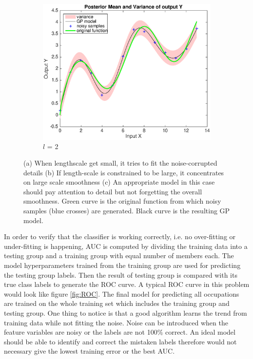 \documentclass[11pt]{report}
\numberwithin{equation}{chapter}
\begin{document}
\begin{spacing}{2}
\begin{figure}[!htb]
\hspace*{0.25\textwidth}
\begin{subfigure}{0.48\textwidth}
\centering
	\includegraphics[scale = 0.4]{fit.eps}
	\caption{$l$ = 2}
\end{subfigure}



\caption{(a) When lengthscale get small, it tries to fit the noise-corrupted details (b) If length-scale is constrained to be large, it concentrates on large scale smoothness (c) An appropriate model in this case should pay attention to detail but not forgetting the overall smoothness. Green curve is the original function from which noisy samples (blue crosses) are generated. Black curve is the resulting GP model.}

\label{fig:overfitting}
\end{figure}

In order to verify that the classifier is working correctly, i.e. no over-fitting or under-fitting is happening, AUC is computed by dividing the training data into a testing group and a training group with equal number of members each. The model hyperparameters trained from the training group are used for predicting the testing group labels. Then the result of testing group is compared with its true class labels to generate the ROC curve. A typical ROC curve in this problem would look like figure \ref{fig:ROC}. The final model for predicting all occupations are trained on the whole training set which includes the training group and testing group. One thing to notice is that a good algorithm learns the trend from training data while not fitting the noise. Noise can be introduced when the feature variables are noisy or the labels are not 100\% correct. An ideal model should be able to identify and correct the mistaken labels therefore would not necessary give the lowest training error or the best AUC.



\end{spacing}
\end{document}
